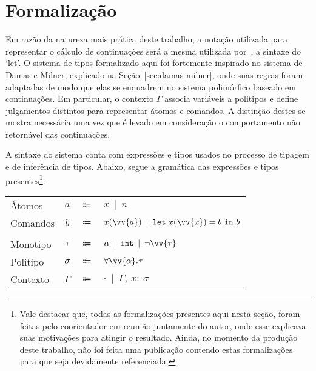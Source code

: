 \section{Formalização}\label{sec:formalizacao}

Em razão da natureza mais prática deste trabalho, a notação utilizada para representar o cálculo de continuações será a mesma utilizada por~\cite{appel1997shrinking}, a sintaxe do `let'.
O sistema de tipos formalizado aqui foi fortemente inspirado no sistema de Damas e Milner, explicado na Seção~\ref{sec:damas-milner}, onde suas regras foram adaptadas de modo que elas se enquadrem no sistema polimórfico baseado em continuações.
Em particular, o contexto $\Gamma$ associa variáveis a politipos e define julgamentos distintos para representar átomos e comandos.
A distinção destes se mostra necessária uma vez que é levado em consideração o comportamento não retornável das continuações. 

A sintaxe do sistema conta com expressões e tipos usados no processo de tipagem e de inferência de tipos.
Abaixo, segue a gramática das expressões e tipos presentes\footnote{Vale destacar que, todas as formalizações presentes aqui nesta seção, foram feitas pelo coorientador em reunião juntamente do autor, onde esse explicava suas motivações para atingir o resultado. Ainda, no momento da produção deste trabalho, não foi feita uma publicação contendo estas formalizações para que seja devidamente referenciada.}:

\phantom{Newline}

\begin{tabular}{lccl}\label{cps-type-system}
  Átomos & $a$ & $\Coloneqq$ & $x \enspace|\enspace n$ \\
  Comandos & $b$ & $\Coloneqq$ & $x(\vv{a}) \enspace|\enspace \mathtt{let}\ x(\vv{x}) = b\ \mathtt{in}\ b$ \\
  \\
  Monotipo & $\tau$ & $\Coloneqq$ & $\alpha \enspace|\enspace \mathtt{int} \enspace|\enspace \neg\vv{\tau}$ \\
  Politipo & $\sigma$ & $\Coloneqq$ & $\forall\vv{\alpha}.\tau$ \\
  Contexto & $\Gamma$ & $\Coloneqq$ & $\cdot \enspace|\enspace \Gamma,\ x{:}\ \sigma$ \\
\end{tabular}

\phantom{Newline}


